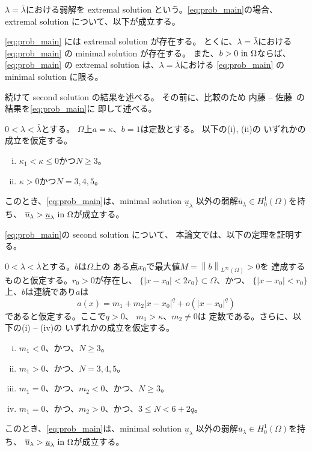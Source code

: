 $\lambda = \bar{\lambda}$における弱解を
extremal solution という。\ref{eq:prob_main}の場合、
extremal solution について、以下が成立する。

\begin{thm} \label{thm:extremal_solution}
 \ref{eq:prob_main} には extremal solution が存在する。
 とくに、$\lambda = \bar{\lambda}$における
 \ref{eq:prob_main} の
 minimal solution が存在する。
 また、$b > 0 ~\text{in}~ \Omega$ならば、\ref{eq:prob_main} の 
 extremal solution は、$\lambda = \bar{\lambda}$における
 \ref{eq:prob_main} の
 minimal solution に限る。
\end{thm}

続けて second solution の結果を述べる。
その前に、比較のため
内藤 -- 佐藤~\cite{MR2886160}の結果を\ref{eq:prob_main}に
即して述べる。

\begin{thm}
 \label{thm:second_solution_naito_sato}
 $0 < \lambda < \bar{\lambda}$とする。
 $\Omega$上$a = \kappa$、$b = 1$は定数とする。
 以下の(i), (ii)の
 いずれかの成立を仮定する。
 \begin{enumerate}[(i)]
  \item $\kappa_1 < \kappa \leq 0$かつ$N \geq 3$。
  \item $\kappa > 0$かつ$N = 3, 4, 5$。
 \end{enumerate}
 このとき、\ref{eq:prob_main}は、minimal solution
 $\underline{u}_\lambda$
 以外の弱解$\bar{u}_\lambda \in H_0^1(\Omega)$を持ち、
 $\overline{u}_\lambda >
 \underline{u}_\lambda ~\text{in}~ \Omega$が成立する。
\end{thm}

\ref{eq:prob_main}の second solution について、
本論文では、以下の定理を証明する。

\begin{thm} \label{thm:second_solution}
 $0 < \lambda < \bar{\lambda}$とする。$b$は$\Omega$上の
 ある点$x_0$で最大値$M = \left\| b \right\|_{L^\infty(\Omega)} > 0$を
 達成するものと仮定する。$r_0 > 0$が存在し、
 $\{ \lvert x - x_0 \rvert < 2r_0 \} \subset \Omega$、かつ、
 $\{ \lvert x - x_0 \rvert < r_0 \}$上、$b$は連続であり$a$は
 \begin{equation}
  a(x) = m_1 + m_2 \lvert x-x_0 \rvert^{q} 
  + o(\lvert x-x_0 \rvert^{q}) \label{eq:a_q}
 \end{equation}
 であると仮定する。ここで$q > 0$、
 $m_1 > \kappa$、$m_2 \neq 0$は
 定数である。さらに、以下の(i) -- (iv)の
 いずれかの成立を仮定する。
 \begin{enumerate}[(i)]
  \item $m_1 < 0$、かつ、$N \geq 3$。
  \item $m_1 > 0$、かつ、$N = 3, 4, 5$。
  \item $m_1 = 0$、かつ、$m_2 < 0$、かつ、$N \geq 3$。
  \item $m_1 = 0$、かつ、$m_2 > 0$、かつ、$3 \leq N < 6 + 2q$。
 \end{enumerate}
 このとき、\ref{eq:prob_main}は、minimal solution
 $\underline{u}_\lambda$
 以外の弱解$\bar{u}_\lambda \in H_0^1(\Omega)$を持ち、
 $\overline{u}_\lambda >
 \underline{u}_\lambda ~\text{in}~ \Omega$が成立する。
\end{thm}

